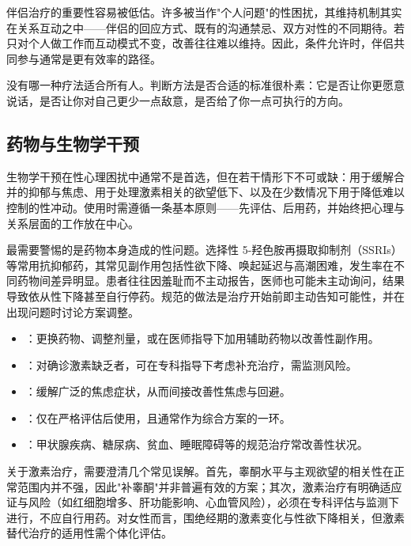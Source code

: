 伴侣治疗的重要性容易被低估。许多被当作"个人问题"的性困扰，其维持机制其实在关系互动之中——伴侣的回应方式、既有的沟通禁忌、双方对性的不同期待。若只对个人做工作而互动模式不变，改善往往难以维持。因此，条件允许时，伴侣共同参与通常是更有效率的路径。

\begin{tcolorbox}[colback=pink!5!white,colframe=red!50!black,title=贴心小叮咛]
没有哪一种疗法适合所有人。判断方法是否合适的标准很朴素：它是否让你更愿意说话，是否让你对自己更少一点敌意，是否给了你一点可执行的方向。
\end{tcolorbox}
\subsection{药物与生物学干预}

生物学干预在性心理困扰中通常不是首选，但在若干情形下不可或缺：用于缓解合并的抑郁与焦虑、用于处理激素相关的欲望低下、以及在少数情况下用于降低难以控制的性冲动。使用时需遵循一条基本原则——先评估、后用药，并始终把心理与关系层面的工作放在中心。

最需要警惕的是药物本身造成的性问题。选择性 5-羟色胺再摄取抑制剂（SSRIs）等常用抗抑郁药，其常见副作用包括性欲下降、唤起延迟与高潮困难，发生率在不同药物间差异明显。患者往往因羞耻而不主动报告，医师也可能未主动询问，结果导致依从性下降甚至自行停药。规范的做法是治疗开始前即主动告知可能性，并在出现问题时讨论方案调整。

\begin{itemize}
  \item {}：更换药物、调整剂量，或在医师指导下加用辅助药物以改善性副作用。
  \item {}：对确诊激素缺乏者，可在专科指导下考虑补充治疗，需监测风险。
  \item {}：缓解广泛的焦虑症状，从而间接改善性焦虑与回避。
  \item {}：仅在严格评估后使用，且通常作为综合方案的一环。
  \item {}：甲状腺疾病、糖尿病、贫血、睡眠障碍等的规范治疗常改善性状况。
\end{itemize}

关于激素治疗，需要澄清几个常见误解。首先，睾酮水平与主观欲望的相关性在正常范围内并不强，因此"补睾酮"并非普遍有效的方案；其次，激素治疗有明确适应证与风险（如红细胞增多、肝功能影响、心血管风险），必须在专科评估与监测下进行，不应自行用药。对女性而言，围绝经期的激素变化与性欲下降相关，但激素替代治疗的适用性需个体化评估。

